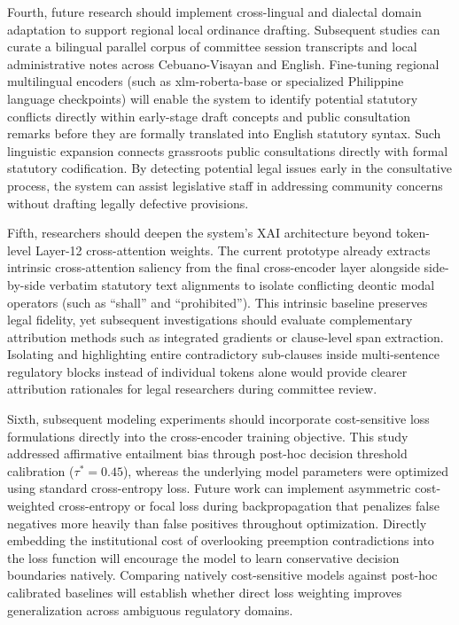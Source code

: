 Fourth, future research should implement cross-lingual and dialectal domain adaptation to support regional local ordinance drafting. Subsequent studies can curate a bilingual parallel corpus of committee session transcripts and local administrative notes across Cebuano-Visayan and English. Fine-tuning regional multilingual encoders (such as xlm-roberta-base or specialized Philippine language checkpoints) will enable the system to identify potential statutory conflicts directly within early-stage draft concepts and public consultation remarks before they are formally translated into English statutory syntax. Such linguistic expansion connects grassroots public consultations directly with formal statutory codification. By detecting potential legal issues early in the consultative process, the system can assist legislative staff in addressing community concerns without drafting legally defective provisions.

Fifth, researchers should deepen the system's XAI architecture beyond token-level Layer-12 cross-attention weights. The current prototype already extracts intrinsic cross-attention saliency from the final cross-encoder layer alongside side-by-side verbatim statutory text alignments to isolate conflicting deontic modal operators (such as ``shall'' and ``prohibited''). This intrinsic baseline preserves legal fidelity, yet subsequent investigations should evaluate complementary attribution methods such as integrated gradients or clause-level span extraction. Isolating and highlighting entire contradictory sub-clauses inside multi-sentence regulatory blocks instead of individual tokens alone would provide clearer attribution rationales for legal researchers during committee review.

Sixth, subsequent modeling experiments should incorporate cost-sensitive loss formulations directly into the cross-encoder training objective. This study addressed affirmative entailment bias through post-hoc decision threshold calibration ($\tau^* = 0.45$), whereas the underlying model parameters were optimized using standard cross-entropy loss. Future work can implement asymmetric cost-weighted cross-entropy or focal loss during backpropagation that penalizes false negatives more heavily than false positives throughout optimization. Directly embedding the institutional cost of overlooking preemption contradictions into the loss function will encourage the model to learn conservative decision boundaries natively. Comparing natively cost-sensitive models against post-hoc calibrated baselines will establish whether direct loss weighting improves generalization across ambiguous regulatory domains.

